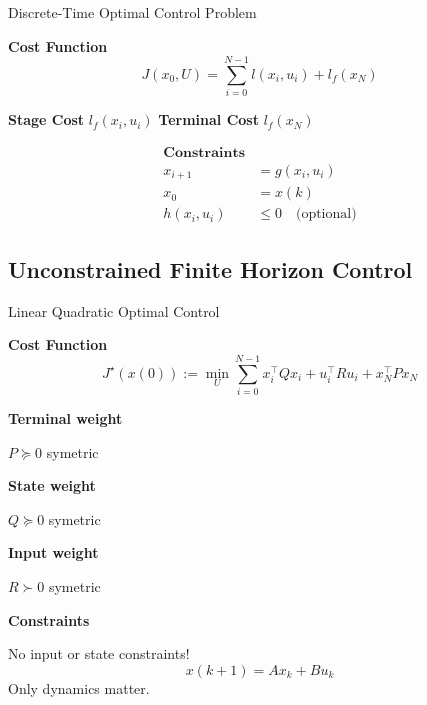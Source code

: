 
\begin{sstTitleBox}
	{Discrete-Time Optimal Control Problem}
	\begin{sstOnlyFrame}

		\textbf{Cost Function}
		\vspace{-3mm}
		\begin{equation}
			J(x_0,U)= \sum_{i=0}^{N-1} l(x_i,u_i) + l_f(x_N)
		\end{equation}

		\begin{minipage}[t]{0.25\linewidth}
			\center
			\textbf{Stage Cost}
			$l_f(x_i,u_i)$
			\textbf{Terminal Cost}
			$l_f(x_N)$
		\end{minipage}
		\begin{minipage}[t]{0.59\linewidth}
			\vspace{-5.5mm}
			\begin{align*}
				\textbf{Constraints}                      \\
				x_{i+1}    & = g(x_i,u_i)                 \\
				x_0        & = x(k)                       \\
				h(x_i,u_i) & \le 0 \quad\text{(optional)}
			\end{align*}
		\end{minipage}
	\end{sstOnlyFrame}
\end{sstTitleBox}

\subsection{Unconstrained Finite Horizon Control}

\begin{sstTitleBox}
	{Linear Quadratic Optimal Control}
	\begin{sstOnlyFrame}
		\textbf{Cost Function}
		\vspace{-3mm}
		\begin{equation}
			J^\star(x(0)) := \min_U
			\sum_{i=0}^{N-1}
			x_i^\top Q x_i + u_i^\top R u_i
			+x_N^\top P x_N
		\end{equation}

		\begin{minipage}[t]{0.33\linewidth}
			\center
			\textbf{Terminal weight}

			$P\succeq0$ symetric

			\textbf{State weight}

			$Q\succeq0$ symetric

			\textbf{Input weight}

			$R\succ0$ symetric
		\end{minipage}
		\begin{minipage}[t]{0.49\linewidth}
			\textbf{Constraints}

			No input or state constraints!
			\[
				x(k+1)=Ax_k+Bu_k
			\]
			Only dynamics matter.
		\end{minipage}

	\end{sstOnlyFrame}
\end{sstTitleBox}

